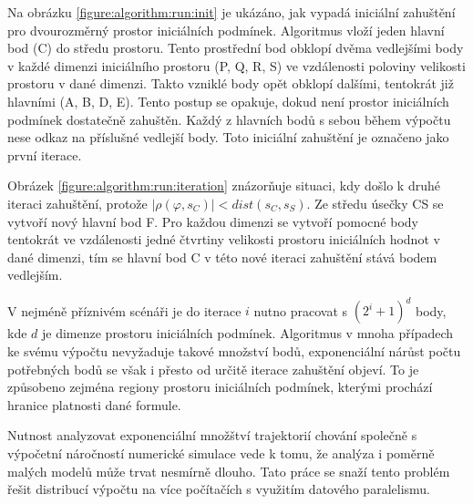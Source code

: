 Na obrázku \ref{figure:algorithm:run:init} je ukázáno, jak vypadá iniciální zahuštění
pro dvourozměrný prostor iniciálních podmínek. Algoritmus vloží jeden hlavní bod (C) do středu prostoru. 
Tento prostřední bod obklopí dvěma vedlejšími body v každé dimenzi iniciálního prostoru (P, Q, R, S) ve vzdálenosti
poloviny velikosti prostoru v dané dimenzi. Takto vzniklé body opět obklopí dalšími, tentokrát již hlavními (A, B, D, E).
Tento postup se opakuje, dokud není prostor iniciálních podmínek dostatečně zahuštěn.
Každý z hlavních bodů s sebou během výpočtu nese odkaz na příslušné vedlejší body.
Toto iniciální zahuštění je označeno jako první iterace.

Obrázek \ref{figure:algorithm:run:iteration} znázorňuje situaci, kdy došlo k druhé iteraci zahuštění,
pro\-tože $\big|\rho(\varphi, s_C)\big| < dist(s_C, s_S)$. Ze středu úsečky CS se vytvoří
nový hlavní bod F. Pro každou dimenzi se vytvoří pomocné body tentokrát ve vzdá\-le\-nosti jedné čtvrtiny
velikosti prostoru iniciálních hodnot v dané dimenzi, tím se hlavní bod C v této
nové iteraci zahuštění stává bodem vedlejším.

V nejméně příznivém scénáři je do iterace $i$ nutno pracovat s $(2^i + 1)^d$ body,
kde $d$ je dimenze prostoru iniciálních podmínek. Algoritmus v mnoha případech
ke svému výpočtu nevyžaduje takové množství bodů, expo\-nen\-ciál\-ní nárůst počtu
potřebných bodů se však i přesto od určitě iterace za\-huš\-tě\-ní objeví. To je způsobeno
zejména regiony prostoru iniciálních podmínek, kterými prochází hranice platnosti dané formule.

Nutnost analyzovat exponenciální množštví trajektorií chování společně s
výpočetní náročností numerické simulace vede k tomu, že analýza i po\-měr\-ně
malých modelů může trvat nesmírně dlouho. Tato práce se snaží tento problém řešit
distribucí výpočtu na více počítačích s využitím datového paralelismu.
